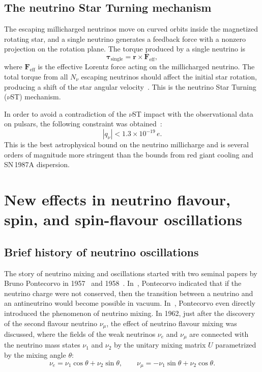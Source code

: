 \documentclass[a4paper,11pt]{article}
\begin{document}
\subsection{The neutrino Star Turning mechanism}

The escaping millicharged neutrinos move on curved orbits inside the magnetized rotating star, and a single neutrino generates a feedback force with a nonzero projection on the rotation plane. The torque produced by a single neutrino is
\begin{equation}
\boldsymbol{\tau}_{\text{single}} = \mathbf{r} \times \mathbf{F}_{\text{eff}},
\end{equation}
where $\mathbf{F}_{\text{eff}}$ is the effective Lorentz force acting on the millicharged neutrino. The total torque from all $N_\nu$ escaping neutrinos should affect the initial star rotation, producing a shift of the star angular velocity~\cite{Studenikin:Tokarev:2014NPB}. This is the neutrino Star Turning ($\nu$ST) mechanism.

In order to avoid a contradiction of the $\nu$ST impact with the observational data on pulsars, the following constraint was obtained~\cite{Studenikin:Tokarev:2014NPB}:
\begin{equation}
|q_\nu| < 1.3 \times 10^{-19}\,e.
\end{equation}
This is the best astrophysical bound on the neutrino millicharge and is several orders of magnitude more stringent than the bounds from red giant cooling and SN\,1987A dispersion.



\section{New effects in neutrino flavour, spin, and spin-flavour oscillations}
\label{sec:new-effects}

\subsection{Brief history of neutrino oscillations}

The story of neutrino mixing and oscillations started with two seminal papers by Bruno Pontecorvo in 1957~\cite{Pontecorvo:1957} and 1958~\cite{Pontecorvo:1958}. In~\cite{Pontecorvo:1957}, Pontecorvo indicated that if the neutrino charge were not conserved, then the transition between a neutrino and an antineutrino would become possible in vacuum. In~\cite{Pontecorvo:1958}, Pontecorvo even directly introduced the phenomenon of neutrino mixing. In 1962, just after the discovery of the second flavour neutrino $\nu_\mu$, the effect of neutrino flavour mixing was discussed, where the fields of the weak neutrinos $\nu_e$ and $\nu_\mu$ are connected with the neutrino mass states $\nu_1$ and $\nu_2$ by the unitary mixing matrix $U$ parametrized by the mixing angle $\theta$:
\begin{equation}
\label{eq:mixing}
\nu_e = \nu_1 \cos\theta + \nu_2 \sin\theta, \qquad \nu_\mu = -\nu_1 \sin\theta + \nu_2 \cos\theta.
\end{equation}
\end{document}
